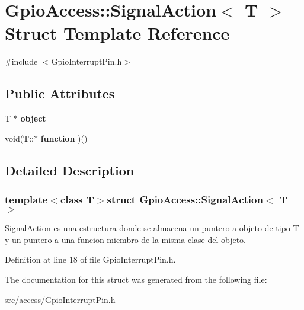 \hypertarget{struct_gpio_access_1_1_signal_action}{\section{\-Gpio\-Access\-:\-:\-Signal\-Action$<$ \-T $>$ \-Struct \-Template \-Reference}
\label{struct_gpio_access_1_1_signal_action}
}


{\ttfamily \#include $<$\-Gpio\-Interrupt\-Pin.\-h$>$}

\subsection*{\-Public \-Attributes}
\begin{DoxyCompactItemize}
\item 
\hypertarget{struct_gpio_access_1_1_signal_action_a42d425871977d70e31aa85a218a4e251}{\-T $\ast$ {\bfseries object}}\label{struct_gpio_access_1_1_signal_action_a42d425871977d70e31aa85a218a4e251}

\item 
\hypertarget{struct_gpio_access_1_1_signal_action_a75a653242029a13e2929865c488ed07c}{void(\-T\-::$\ast$ {\bfseries function} )()}\label{struct_gpio_access_1_1_signal_action_a75a653242029a13e2929865c488ed07c}

\end{DoxyCompactItemize}


\subsection{\-Detailed \-Description}
\subsubsection*{template$<$class T$>$struct Gpio\-Access\-::\-Signal\-Action$<$ T $>$}

\hyperlink{struct_gpio_access_1_1_signal_action}{\-Signal\-Action} es una estructura donde se almacena un puntero a objeto de tipo \-T y un puntero a una funcion miembro de la misma clase del objeto. 

\-Definition at line 18 of file \-Gpio\-Interrupt\-Pin.\-h.



\-The documentation for this struct was generated from the following file\-:\begin{DoxyCompactItemize}
\item 
src/access/\-Gpio\-Interrupt\-Pin.\-h\end{DoxyCompactItemize}
